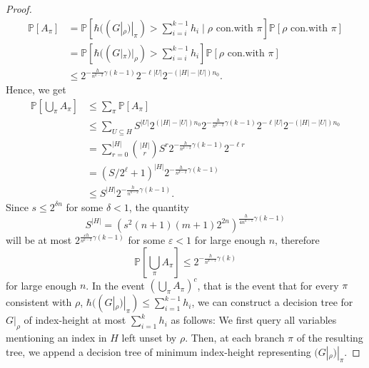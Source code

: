 \begin{proof}
\begin{align*}
\mathbb P[A_\pi]&=\mathbb P\left[\hbar((G|_\rho)|_\pi)>\sum_{i=i}^{k-1}h_i\mid\rho\text{ con.with }\pi\right]\mathbb P[\rho\text{ con.with }\pi]\\
&=\mathbb P\left[\hbar((G|_\pi)|_\rho)>\sum_{i=i}^{k-1}h_i\right]\mathbb P[\rho\text{ con.with }\pi]\\
&\le2^{-\frac h{n^{k-2}}\gamma(k-1)}2^{-\ell|U|}2^{-(|H|-|U|)n_0}.
\end{align*}
Hence, we get
\begin{align*}
\mathbb P\left[\bigcup_\pi A_\pi\right]&\le\sum_\pi\mathbb P[A_\pi]\\
&\le\sum_{U\subseteq H}S^{|U|}2^{(|H|-|U|)n_0}2^{-\frac h{n^{k-2}}\gamma(k-1)}2^{-\ell|U|}2^{-(|H|-|U|)n_0}\\
&=\sum_{r=0}^{|H|}\binom{|H|}{r}S^r2^{-\frac h{n^{k-2}}\gamma(k-1)}2^{-\ell r}\\
&=(S/2^\ell+1)^{|H|}2^{-\frac h{n^{k-2}}\gamma(k-1)}\\
&\le S^{|H|}2^{-\frac h{n^{k-2}}\gamma(k-1)}.
\end{align*}
Since $s\le2^{\delta n}$ for some $\delta<1$, the quantity
\[S^{|H|}=\left(s^2(n+1)(m+1)2^{2n}\right)^{\frac h{4n^{k-1}}\gamma(k-1)}\]
will be at most $2^{\frac{\varepsilon h}{n^{k-2}}\gamma(k-1)}$ for some $\varepsilon<1$ for large enough $n$, therefore
\[\mathbb P\left[\bigcup_\pi A_\pi\right]\le2^{-\frac h{n^{k-1}}\gamma(k)}\]
for large enough $n$.
In the event $\left(\bigcup_\pi A_\pi\right)^c$, that is the event that for every $\pi$ consistent with $\rho$, $\hbar((G|_\rho)|_\pi)\le\sum_{i=1}^{k-1}h_i$, we can construct a decision tree for $G|_\rho$ of index-height at most $\sum_{i=1}^kh_i$ as follows: We first query all variables mentioning an index in $H$ left unset by $\rho$. Then, at each branch $\pi$ of the resulting tree, we append a decision tree of minimum index-height representing $(G|_\rho)|_\pi$.
\end{proof}
